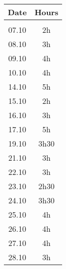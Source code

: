 \vspace{0.5cm}
\begin{tabular}[H]{cc}
	Date & Hours\\
	\hline\\
	07.10	&	2h\\
	08.10	&	3h\\
	09.10	&	4h\\
	10.10	&	4h\\
	14.10	&	5h\\
	15.10	&	2h\\
	16.10	&	3h\\
	17.10	&	5h\\
	19.10	&	3h30\\
	21.10	&	3h\\
	22.10	&	3h\\
	23.10	&	2h30\\
	24.10	&	3h30\\
	25.10	&	4h\\
	26.10	&	4h\\
	27.10	&	4h\\
	28.10	&	3h
\end{tabular}